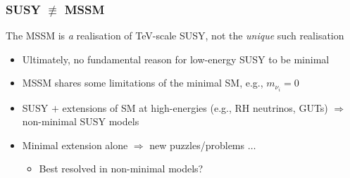 \documentclass[10pt,aspectratio=169]{beamer}
\begin{document}
\begin{frame}
  \frametitle{SUSY $\not\equiv$ MSSM}
  \begin{center}
    The MSSM is \emph{a} realisation of TeV-scale SUSY, {\color{red}
      not the \emph{unique} such realisation}
  \end{center}
  \begin{itemize}\itemsep1em
  \item Ultimately, no fundamental reason for low-energy SUSY to be minimal
  \item MSSM shares some limitations of the minimal SM, e.g., $m_{\nu_i} = 0$
  \item SUSY $+$ extensions of SM at high-energies (e.g., RH neutrinos, GUTs)
    $\Rightarrow$ non-minimal SUSY models
  \item Minimal extension alone $\Rightarrow$ new puzzles/problems $\ldots$
    \begin{itemize}
      \item Best resolved in non-minimal models?
    \end{itemize}
  \end{itemize}
\end{frame}
\end{document}
